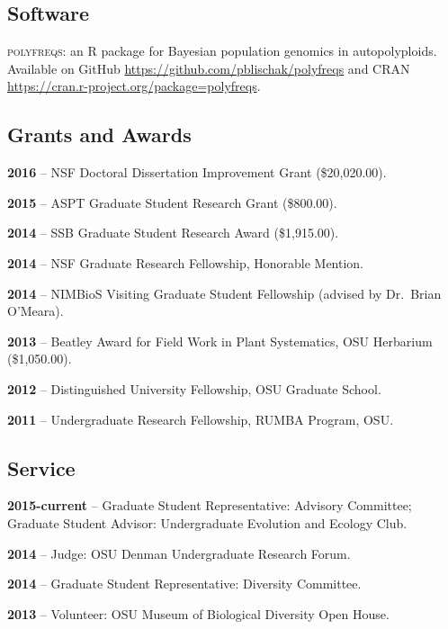 \documentclass[]{article}
\begin{document}
\subsection{\texorpdfstring{\textbf{Software}}{Software}}\label{software}

\textsc{polyfreqs}: an R package for Bayesian population genomics in autopolyploids. Available on GitHub 
\href{https://github.com/pblischak/polyfreqs}{\url{https://github.com/pblischak/polyfreqs}} and CRAN 
\href{https://cran.r-project.org/package=polyfreqs}{\url{https://cran.r-project.org/package=polyfreqs}}.

\subsection{\texorpdfstring{\textbf{Grants and
Awards}}{Grants and Awards}}\label{grants-and-awards}

\textbf{2016} -- NSF Doctoral Dissertation Improvement Grant (\$20,020.00).

\textbf{2015} -- ASPT Graduate Student Research Grant (\$800.00).

\textbf{2014} -- SSB Graduate Student Research Award (\$1,915.00).

\textbf{2014} -- NSF Graduate Research Fellowship, Honorable Mention.

\textbf{2014} -- NIMBioS Visiting Graduate Student Fellowship (advised
by Dr.~Brian O'Meara).

\textbf{2013} -- Beatley Award for Field Work in Plant Systematics, OSU
Herbarium (\$1,050.00).

\textbf{2012} -- Distinguished University Fellowship, OSU Graduate
School.

\textbf{2011} -- Undergraduate Research Fellowship, RUMBA Program, OSU.

\subsection{\texorpdfstring{\textbf{Service}}{Service}}\label{service}

\textbf{2015-current} -- Graduate Student Representative: Advisory Committee; Graduate Student Advisor: Undergraduate Evolution and Ecology Club.

\textbf{2014} -- Judge: OSU Denman Undergraduate Research Forum.

\textbf{2014} -- Graduate Student Representative: Diversity Committee.

\textbf{2013} -- Volunteer: OSU Museum of Biological Diversity Open House.
\end{document}

